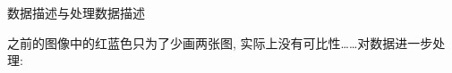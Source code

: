 \begin{frame}{数据描述与处理}{数据描述}

\vspace{-0.2cm}

之前的图像中的红蓝色只为了少画两张图, 实际上没有可比性……对数据进一步处理:

\begin{figure}[bth]
\end{figure}

\end{frame}

